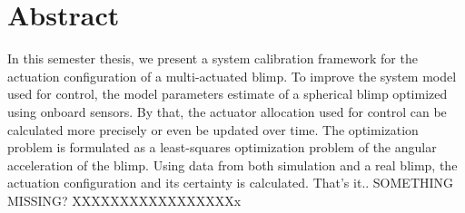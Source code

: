\chapter*{Abstract}

In this semester thesis, we present a system calibration framework for the actuation configuration of a multi-actuated blimp.
To improve the system model used for control, the model parameters estimate of a spherical blimp optimized using onboard sensors.
By that, the actuator allocation used for control can be calculated more precisely or even be updated over time.
The optimization problem is formulated as a least-squares optimization problem of the angular acceleration of the blimp.
Using data from both simulation and a real blimp, the actuation configuration and its certainty is calculated.
That's it.. SOMETHING MISSING? XXXXXXXXXXXXXXXXXx

